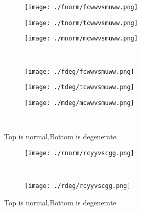 \documentclass[aps,floats,floatfix,nofootinbib]{revtex4-1}
\begin{document}
\begin{center}
\begin{figure}
\begin{subfigure}{0.3\textwidth}
\texttt{[image: ./fnorm/fcwwvsmuww.png]}
\label{}
\end{subfigure}
\begin{subfigure}{0.3\textwidth}
\texttt{[image: ./tnorm/tcwwvsmuww.png]}
\label{}
\end{subfigure}
\begin{subfigure}{0.3\textwidth}
\texttt{[image: ./mnorm/mcwwvsmuww.png]}
\label{}
\end{subfigure}\\
\begin{subfigure}{0.3\textwidth}
\texttt{[image: ./fdeg/fcwwvsmuww.png]}
\label{}
\end{subfigure}
\begin{subfigure}{0.3\textwidth}
\texttt{[image: ./tdeg/tcwwvsmuww.png]}
\label{}
\end{subfigure}
\begin{subfigure}{0.3\textwidth}
\texttt{[image: ./mdeg/mcwwvsmuww.png]}
\label{}
\end{subfigure}\\
\caption{Top is normal,Bottom is degenerate}
\end{figure}
\end{center}

\begin{center}
\begin{figure}
\begin{subfigure}{0.95\textwidth}
\texttt{[image: ./rnorm/rcyyvscgg.png]}
\label{}
\end{subfigure}\\
\begin{subfigure}{0.95\textwidth}
\texttt{[image: ./rdeg/rcyyvscgg.png]}
\label{}
\end{subfigure}
\caption{Top is normal,Bottom is degenerate}
\end{figure}
\end{center}
\end{document}
